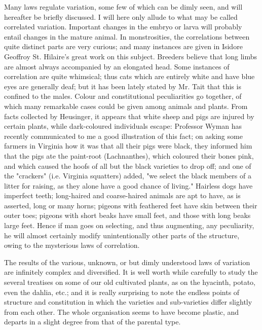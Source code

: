 Many laws regulate variation, some few of which can be dimly
seen, and will hereafter be briefly discussed. I will here only
allude to what may be called correlated variation. Important
changes in the embryo or larva will probably entail changes in the
mature animal. In monstrosities, the correlations between quite
distinct parts are very curious; and many instances are given in
Isidore Geoffroy St. Hilaire's great work on this subject. Breeders
believe that long limbs are almost always accompanied by an
elongated head. Some instances of correlation are quite whimsical;
thus cats which are entirely white and have blue eyes are generally
deaf; but it has been lately stated by Mr. Tait that this is
confined to the males. Colour and constitutional peculiarities go
together, of which many remarkable cases could be given among
animals and plants. From facts collected by Heusinger, it appears
that white sheep and pigs are injured by certain plants, while
dark-coloured individuals escape: Professor Wyman has recently
communicated to me a good illustration of this fact; on asking some
farmers in Virginia how it was that all their pigs were black, they
informed him that the pigs ate the paint-root (Lachnanthes), which
coloured their bones pink, and which caused the hoofs of all but
the black varieties to drop off; and one of the "crackers" (i.e.
Virginia squatters) added, "we select the black members of a litter
for raising, as they alone have a good chance of living." Hairless
dogs have imperfect teeth; long-haired and coarse-haired animals
are apt to have, as is asserted, long or many horns; pigeons with
feathered feet have skin between their outer toes; pigeons with
short beaks have small feet, and those with long beaks large feet.
Hence if man goes on selecting, and thus augmenting, any
peculiarity, he will almost certainly modify unintentionally other
parts of the structure, owing to the mysterious laws of
correlation.

The results of the various, unknown, or but dimly understood
laws of variation are infinitely complex and diversified. It is
well worth while carefully to study the several treatises on some
of our old cultivated plants, as on the hyacinth, potato, even the
dahlia, etc.; and it is really surprising to note the endless
points of structure and constitution in which the varieties and
sub-varieties differ slightly from each other. The whole
organisation seems to have become plastic, and departs in a slight
degree from that of the parental type.

